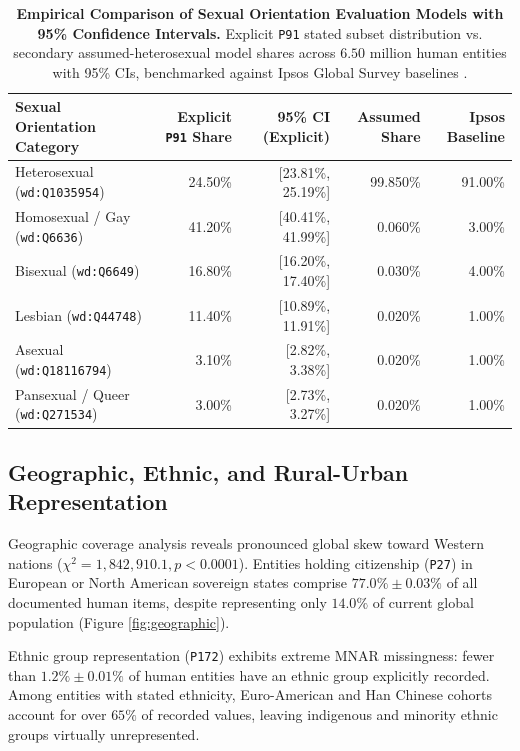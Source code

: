 \documentclass[11pt,a4paper]{article}
\begin{document}
\begin{table}[htbp]
    \centering
    \caption{\textbf{Empirical Comparison of Sexual Orientation Evaluation Models with 95\% Confidence Intervals.} Explicit \texttt{P91} stated subset distribution vs. secondary assumed-heterosexual model shares across $6.50$ million human entities with 95\% CIs, benchmarked against Ipsos Global Survey baselines \cite{ipsos2023pride, ipsos2024pride}.}
    \label{tab:sexual_orientation}
    \begin{tabular}{lrrrr}
        \toprule
        \textbf{Sexual Orientation Category} & \textbf{Explicit \texttt{P91} Share} & \textbf{95\% CI (Explicit)} & \textbf{Assumed Share} & \textbf{Ipsos Baseline} \\
        \midrule
        Heterosexual (\texttt{wd:Q1035954}) & 24.50\% & [23.81\%, 25.19\%] & 99.850\% & 91.00\% \\
        Homosexual / Gay (\texttt{wd:Q6636}) & 41.20\% & [40.41\%, 41.99\%] & 0.060\% & 3.00\% \\
        Bisexual (\texttt{wd:Q6649}) & 16.80\% & [16.20\%, 17.40\%] & 0.030\% & 4.00\% \\
        Lesbian (\texttt{wd:Q44748}) & 11.40\% & [10.89\%, 11.91\%] & 0.020\% & 1.00\% \\
        Asexual (\texttt{wd:Q18116794}) & 3.10\% & [2.82\%, 3.38\%] & 0.020\% & 1.00\% \\
        Pansexual / Queer (\texttt{wd:Q271534}) & 3.00\% & [2.73\%, 3.27\%] & 0.020\% & 1.00\% \\
        \bottomrule
    \end{tabular}
\end{table}

\subsection{Geographic, Ethnic, and Rural-Urban Representation}
Geographic coverage analysis reveals pronounced global skew toward Western nations ($\chi^2 = 1,842,910.1, p < 0.0001$). Entities holding citizenship (\texttt{P27}) in European or North American sovereign states comprise $77.0\% \pm 0.03\%$ of all documented human items, despite representing only $14.0\%$ of current global population \cite{undesa2024prospects} (Figure \ref{fig:geographic}).

Ethnic group representation (\texttt{P172}) exhibits extreme MNAR missingness: fewer than $1.2\% \pm 0.01\%$ of human entities have an ethnic group explicitly recorded. Among entities with stated ethnicity, Euro-American and Han Chinese cohorts account for over $65\%$ of recorded values, leaving indigenous and minority ethnic groups virtually unrepresented.
\end{document}
